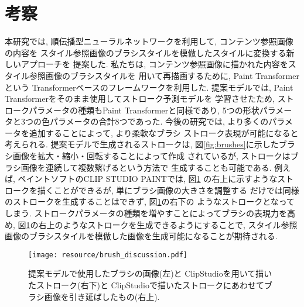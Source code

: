 \documentclass[MIRU,submit,uplatex]{miru2023j}
\begin{document}
\section{考察}
本研究では, 順伝播型ニューラルネットワークを利用して, コンテンツ参照画像の内容を
スタイル参照画像のブラシスタイルを模倣したスタイルに変換する新しいアプローチを
提案した. 私たちは, コンテンツ参照画像に描かれた内容をスタイル参照画像のブラシスタイルを
用いて再描画するために, Paint Transformer \cite{PaintTransformer} という
Transformerベースのフレームワークを利用した. 
提案モデルでは, Paint Transformerをそのまま使用してストローク予測モデルを
学習させたため, ストロークパラメータの種類もPaint Transformerと同様であり,  
5つの形状パラメータと3つの色パラメータの合計8つであった. 
今後の研究では, より多くのパラメータを追加することによって, より柔軟なブラシ
ストローク表現が可能になると考えられる. 提案モデルで生成されるストロークは, 
図\ref{fig:brushes}に示したブラシ画像を拡大・縮小・回転することによって作成
されているが, ストロークはブラシ画像を連続して複数繋げるという方法で
生成することも可能である. 
例えば, ペイントソフトのCLIP STUDIO PAINT\cite{ClipStudio}では, 図\ref{fig:discussion}
の右上に示すようなストロークを描くことができるが, 単にブラシ画像の大きさを調整する
だけでは同様のストロークを生成することはできず, 図\ref{fig:discussion}の右下の
ようなストロークとなってしまう. 
ストロークパラメータの種類を増やすことによってブラシの表現力を高め, 
図\ref{fig:discussion}の右上のようなストロークを生成できるようにすることで, 
スタイル参照画像のブラシスタイルを模倣した画像を生成可能になることが期待される. 
\begin{figure}[t]
    \centering
    \texttt{[image: resource/brush\_discussion.pdf]}
    \caption{提案モデルで使用したブラシの画像(左)と
    ClipStudioを用いて描いたストローク(右下)と
    ClipStudioで描いたストロークにあわせてブラシ画像を引き延ばしたもの(右上).}
    \label{fig:discussion}
\end{figure}
%

\newpage


\end{document}
